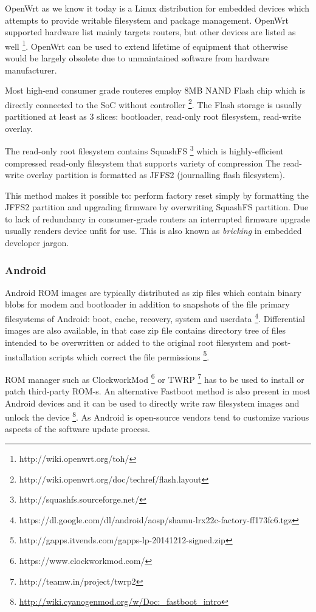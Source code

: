 \documentclass{article}
\begin{document}
OpenWrt as we know it today is a Linux distribution for embedded devices
which attempts to provide writable filesystem and package management.
OpenWrt supported hardware list mainly targets routers, but other devices are
listed as well \footnote{http://wiki.openwrt.org/toh/}. OpenWrt can be used to
extend lifetime of equipment that otherwise would be largely obsolete due
to unmaintained software from hardware manufacturer.

Most high-end consumer grade routeres employ 8MB NAND Flash chip which is
directly connected to the SoC without controller
\footnote{http://wiki.openwrt.org/doc/techref/flash.layout}.
The Flash storage is usually partitioned at least as 3 slices:
bootloader, read-only root filesystem, read-write overlay.

The read-only root filesystem contains SquashFS
\footnote{http://squashfs.sourceforge.net/}
which is highly-efficient compressed read-only filesystem that
supports variety of compression The read-write overlay partition
is formatted as JFFS2 (journalling flash filesystem).

This method makes it possible to: perform factory reset simply by
formatting the JFFS2 partition and upgrading firmware by overwriting
SquashFS partition. Due to lack of redundancy in consumer-grade routers
an interrupted firmware upgrade usually renders device unfit for use. This is also known as \emph{bricking} in embedded developer jargon.


\subsubsection{Android}

Android ROM images are typically distributed as zip files which contain 
binary blobs for modem and bootloader in addition to snapshots of the
file primary filesystems of Android: boot, cache, recovery, system and
userdata
\footnote{https://dl.google.com/dl/android/aosp/shamu-lrx22c-factory-ff173fc6.tgz}.
Differential images are also available, in that case zip file contains
directory tree of files intended to be overwritten or added to the original
root filesystem and post-installation scripts which correct the file permissions
\footnote{http://gapps.itvends.com/gapps-lp-20141212-signed.zip}.

ROM manager such as ClockworkMod \footnote{https://www.clockworkmod.com/} or
TWRP \footnote{http://teamw.in/project/twrp2} has to be used to install or patch
third-party ROM-s.
An alternative Fastboot method is also present in most
Android devices and it can be used to directly write raw filesystem images and
unlock the device
\footnote{\url{http://wiki.cyanogenmod.org/w/Doc:_fastboot_intro}}.
As Android is open-source vendors tend to customize various aspects
of the software update process.
\end{document}
